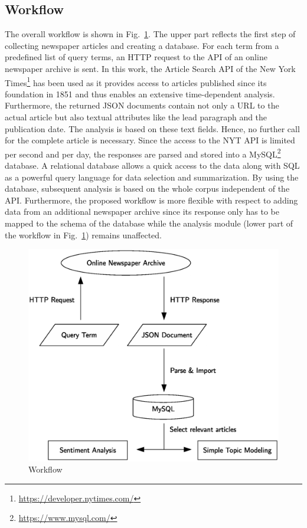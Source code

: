 \documentclass[10pt,a4paper,twocolumn]{scrartcl}
\begin{document}
\subsection*{Workflow} The overall workflow is shown in Fig.~\ref{fig:workflow}. The upper part reflects the first step of collecting newspaper articles and creating a database. For each term from a predefined list of query terms, an HTTP request to the API of an online newspaper archive is sent. In this work, the Article Search API of the New York Times\footnote{\url{https://developer.nytimes.com/}} has been used as it provides access to articles published since its foundation in 1851 and thus enables an extensive time-dependent analysis. Furthermore, the returned JSON documents contain not only a URL to the actual article but also textual attributes like the lead paragraph and the publication date. The analysis is based on these text fields. Hence, no further call for the complete article is necessary. Since the access to the NYT API is limited per second and per day, the responses are parsed and stored into a MySQL\footnote{\url{https://www.mysql.com/}} database. A relational database allows a quick access to the data along with SQL as a powerful query language for data selection and summarization. By using the database, subsequent analysis is based on the whole corpus independent of the API. Furthermore, the proposed workflow is more flexible with respect to adding data from an additional newspaper archive since its response only has to be mapped to the schema of the database while the analysis module (lower part of the workflow in Fig.~\ref{fig:workflow}) remains unaffected.

\begin{figure}
\includegraphics[width=\columnwidth]{figures/workflow_eps}
\caption{Workflow} \label{fig:workflow}
\end{figure}
\end{document}
